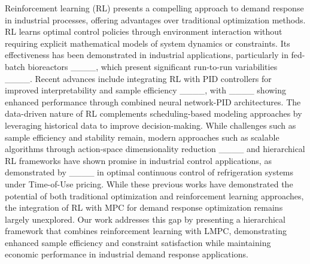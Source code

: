 Reinforcement learning (RL) presents a compelling approach to demand response in industrial processes, offering advantages over traditional optimization methods. RL learns optimal control policies through environment interaction without requiring explicit mathematical models of system dynamics or constraints. Its effectiveness has been demonstrated in industrial applications, particularly in fed-batch bioreactors ____, which present significant run-to-run variabilities ____. Recent advances include integrating RL with PID controllers for improved interpretability and sample efficiency ____, with ____ showing enhanced performance through combined neural network-PID architectures. The data-driven nature of RL complements scheduling-based modeling approaches by leveraging historical data to improve decision-making. While challenges such as sample efficiency and stability remain, modern approaches such as scalable algorithms through action-space dimensionality reduction ____ and hierarchical RL frameworks have shown promise in industrial control applications, as demonstrated by ____ in optimal continuous control of refrigeration systems under Time-of-Use pricing. While these previous works have demonstrated the potential of both traditional optimization and reinforcement learning approaches, the integration of RL with MPC for demand response optimization remains largely unexplored. Our work addresses this gap by presenting a hierarchical framework that combines reinforcement learning with LMPC, demonstrating enhanced sample efficiency and constraint satisfaction while maintaining economic performance in industrial demand response applications.